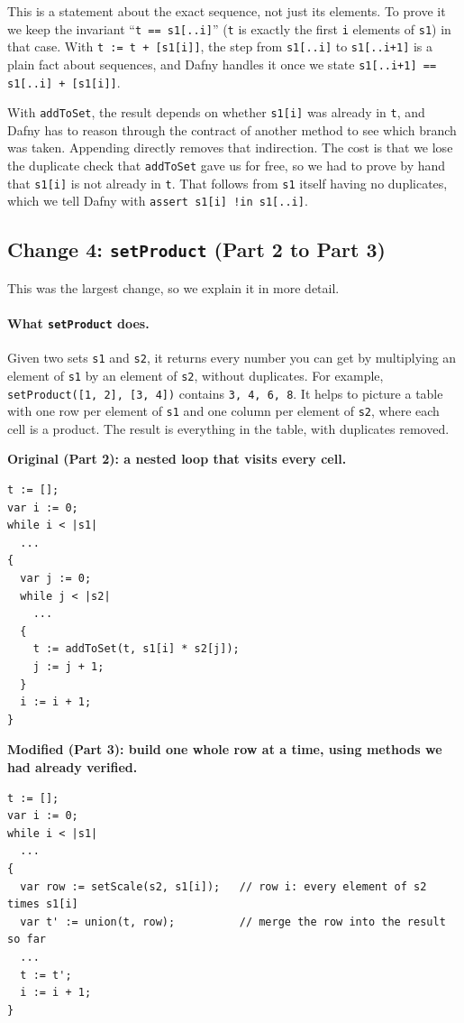 \documentclass[11pt,a4paper]{article}
\begin{document}
This is a statement about the exact sequence, not just its elements. To prove it we keep the invariant ``\texttt{t == s1[..i]}'' (\texttt{t} is exactly the first \texttt{i} elements of \texttt{s1}) in that case. With \texttt{t := t + [s1[i]]}, the step from \texttt{s1[..i]} to \texttt{s1[..i+1]} is a plain fact about sequences, and Dafny handles it once we state \texttt{s1[..i+1] == s1[..i] + [s1[i]]}.

With \texttt{addToSet}, the result depends on whether \texttt{s1[i]} was already in \texttt{t}, and Dafny has to reason through the contract of another method to see which branch was taken. Appending directly removes that indirection. The cost is that we lose the duplicate check that \texttt{addToSet} gave us for free, so we had to prove by hand that \texttt{s1[i]} is not already in \texttt{t}. That follows from \texttt{s1} itself having no duplicates, which we tell Dafny with \texttt{assert s1[i] !in s1[..i]}.

\subsection*{Change 4: \texttt{setProduct} (Part 2 to Part 3)}

This was the largest change, so we explain it in more detail.

\paragraph{What \texttt{setProduct} does.} Given two sets \texttt{s1} and \texttt{s2}, it returns every number you can get by multiplying an element of \texttt{s1} by an element of \texttt{s2}, without duplicates. For example, \texttt{setProduct([1, 2], [3, 4])} contains \texttt{3, 4, 6, 8}. It helps to picture a table with one row per element of \texttt{s1} and one column per element of \texttt{s2}, where each cell is a product. The result is everything in the table, with duplicates removed.

\textbf{Original (Part 2): a nested loop that visits every cell.}
\begin{lstlisting}
t := [];
var i := 0;
while i < |s1|
  ...
{
  var j := 0;
  while j < |s2|
    ...
  {
    t := addToSet(t, s1[i] * s2[j]);
    j := j + 1;
  }
  i := i + 1;
}
\end{lstlisting}

\textbf{Modified (Part 3): build one whole row at a time, using methods we had already verified.}
\begin{lstlisting}
t := [];
var i := 0;
while i < |s1|
  ...
{
  var row := setScale(s2, s1[i]);   // row i: every element of s2 times s1[i]
  var t' := union(t, row);          // merge the row into the result so far
  ...
  t := t';
  i := i + 1;
}
\end{lstlisting}
\end{document}
